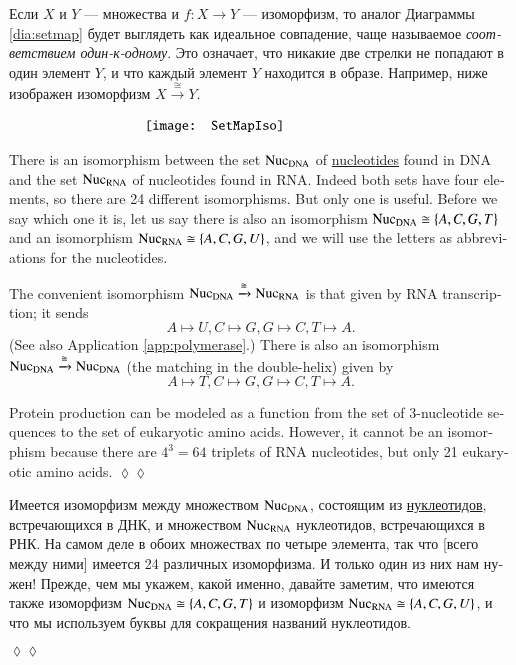 \documentclass[a4paper]{book}
\def\tn{\textnormal}
\def\to{\rightarrow}
\def\taking{\colon}
\def\iso{\cong}
\newcommand{\To}[1]{\xrightarrow{#1}}
\theoremstyle{myth}
\newtheorem{appENG}[envENG]{\begin{english}Application\end{english}}
\newenvironment{applicationENG}{\begin{appENG}}{\hspace*{\fill}$\lozenge\lozenge$\end{appENG}}
\newtheorem{exampleRUS}[envRUS]{\begin{russian}Пример\end{russian}}
\newtheorem{appRUS}[envRUS]{\begin{russian}Прикладной пример (применение)\end{russian}}
\newenvironment{applicationRUS}{\begin{appRUS}}{\hspace*{\fill}$\lozenge\lozenge$\end{appRUS}}
\begin{document}
\begin{english}
\begin{exampleRUS}
\begin{russian}
Если $X$ и $Y$ — множества и $f\taking X\to Y$ — изоморфизм, то аналог Диаграммы \ref{dia:setmap} будет выглядеть как идеальное совпадение, чаще называемое {\em соответствием один-к-одному}. Это означает, что никакие две стрелки не попадают в один элемент $Y$, и что каждый элемент $Y$ находится в образе. Например, ниже изображен изоморфизм $X\To{\iso}Y$.
\end{russian}
\end{exampleRUS}

\begin{align}\label{dia:setmapiso}
\parbox{2.3in}{\texttt{[image: SetMapIso]}}
\end{align}

\begin{applicationENG}\label{app:DNA RNA}
There is an isomorphism between the set $\tn{Nuc}_\tn{DNA}$ of \href{http://en.wikipedia.org/wiki/Nucleotides}{\text nucleotides} found in DNA and the set $\tn{Nuc}_\tn{RNA}$ of nucleotides found in RNA. Indeed both sets have four elements, so there are 24 different isomorphisms. But only one is useful. Before we say which one it is, let us say there is also an isomorphism $\tn{Nuc}_\tn{DNA}\iso\{A,C,G,T\}$ and an isomorphism $\tn{Nuc}_\tn{RNA}\iso\{A,C,G,U\}$, and we will use the letters as abbreviations for the nucleotides. 

The convenient isomorphism $\tn{Nuc}_\tn{DNA}\To{\iso}\tn{Nuc}_\tn{RNA}$ is that given by RNA transcription; it sends 
$$A\mapsto U, C\mapsto G, G\mapsto C, T\mapsto A.$$ 
(See also Application \ref{app:polymerase}.) There is also an isomorphism $\tn{Nuc}_\tn{DNA}\To{\iso}\tn{Nuc}_\tn{DNA}$ (the matching in the double-helix) given by 
$$A\mapsto T, C\mapsto G, G\mapsto C, T\mapsto A.$$

Protein production can be modeled as a function from the set of 3-nucleotide sequences to the set of eukaryotic amino acids. However, it cannot be an isomorphism because there are $4^3=64$ triplets of RNA nucleotides, but only 21 eukaryotic amino acids. 
\end{applicationENG}

\begin{applicationRUS}\label{app:DNA RNA}
\begin{russian}Имеется изоморфизм между множеством $\tn{Nuc}_\tn{DNA}$, состоящим из  \href{https://ru.wikipedia.org/wiki/%D0%9D%D1%83%D0%BA%D0%BB%D0%B5%D0%BE%D1%82%D0%B8%D0%B4%D1%8B}{\text нуклеотидов}, встречающихся в ДНК, и множеством $\tn{Nuc}_\tn{RNA}$ нуклеотидов, встречающихся в РНК. На самом деле в обоих множествах по четыре элемента, так что [всего между ними] имеется 24 различных изоморфизма. И только один из них нам нужен! Прежде, чем мы укажем, какой именно, давайте заметим, что имеются также изоморфизм $\tn{Nuc}_\tn{DNA}\iso\{A,C,G,T\}$ и изоморфизм $\tn{Nuc}_\tn{RNA}\iso\{A,C,G,U\}$, и что мы используем буквы для сокращения названий нуклеотидов. \end{russian}


\end{applicationRUS}
\end{english}
\end{document}
